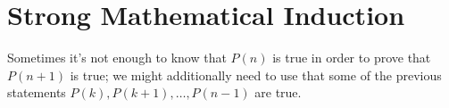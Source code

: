 \documentclass[11pt,dvipsnames]{book}
\numberwithin{figure}{section} %
\numberwithin{table}{section} %
\begin{document}

%
%
%

\section{Strong Mathematical Induction}%
\label{stronginduction}
Sometimes it's not enough to know that $P(n)$ is true in order to prove that $P(n+1)$ is true; we might additionally need to use that some of the previous statements $P(k), P(k+1), \dots , P(n-1)$ are true.  \\
%
%
%
\end{document}
